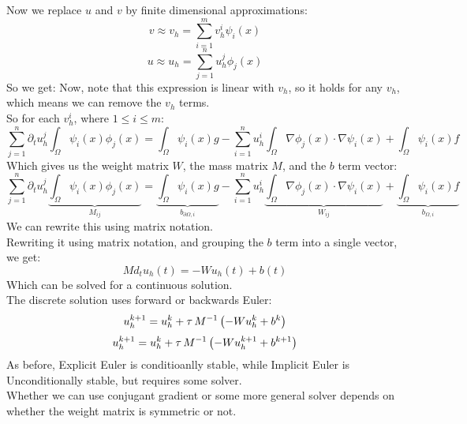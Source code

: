 \documentclass[12pt]{article}
\begin{document}
Now we replace $u$ and $v$ by finite dimensional
approximations:
\[ v \approx v_h = \sum_{i = 1}^m v^i_h \psi_i(x) \]
\[ u \approx u_h = \sum_{j = 1}^n u^j_h \phi_j(x) \]
So we get:
Now, note that this expression is linear with $v_h$,
so it holds for any $v_h$, which means we can remove
the $v_h$ terms. \\
So for each $v_h^i$, where $1 \leq i \leq m$:
\[ \sum_{j = 1}^n \partial_t u^j_h
\int_\Omega \psi_i(x) \phi_j(x) = 
\int_\Omega \psi_i(x)g - \sum_{i = 1}^n u^i_h 
\int_\Omega \nabla \phi_j(x) \cdot \nabla \psi_i(x) + 
\int_\Omega \psi_i(x)f \]
Which gives us the weight matrix $W$, 
the mass matrix $M$,
and the $b$ term vector:
\[ \sum_{j = 1}^n \partial_t u^j_h
\underbrace{\int_\Omega \psi_i(x) \phi_j(x)}_{M_{ij}} = 
\underbrace{\int_\Omega 
\psi_i(x)g}_{b_{\partial \Omega, i}} 
- \sum_{i = 1}^n u^i_h 
\underbrace{\int_\Omega \nabla \phi_j(x) \cdot 
\nabla \psi_i(x)}_{W_{ij}} + 
\underbrace{\int_\Omega \psi_i(x)f}_{b_{\Omega, i}} \]
We can rewrite this using matrix notation. \\

Rewriting it using matrix notation, and grouping
the $b$ term into a single vector, we get:
\[ M d_tu_h(t) = -Wu_h(t) + b(t) \]
Which can be solved for a continuous solution. \\

The discrete solution uses forward or backwards Euler:
\[ u_h^{k+1} = u_h^k + \tau \, 
M^{-1} \left(  - W u_h^k + b^k \right) \]
\[ u_h^{k+1} = u_h^k + \tau \, M^{-1} 
\left( - W u_h^{k+1} + b^{k+1} \right) \]
As before, Explicit Euler is conditioanlly stable,
while Implicit Euler is Unconditionally stable,
but requires some solver. \\
Whether we can use conjugant gradient or some more
general solver depends on whether the weight matrix
is symmetric or not. \\
\end{document}
